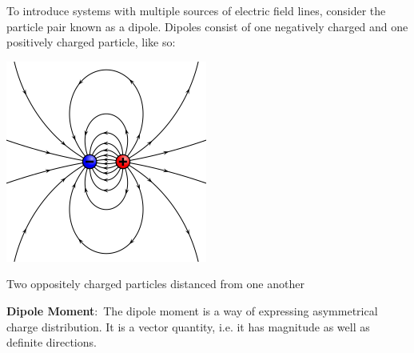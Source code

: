 \documentclass[nobib]{tufte-handout}
\newcommand{\defn}[2]{\noindent\textbf{#1}:\ #2}
\begin{document}
To introduce systems with multiple sources of electric field lines, consider
the particle pair known as a dipole. Dipoles consist of one negatively charged
and one positively charged particle, like so:
\begin{marginfigure}
    \centering
    \includegraphics[width=\textwidth / 2]{images/VFPt_dipole_electric.svg.png}
    \caption{Two oppositely charged particles distanced from one another}
    \label{fig:dipole}
\end{marginfigure}

\defn{Dipole Moment}{The dipole moment is a way of expressing asymmetrical charge distribution.
It is a vector quantity, i.e. it has magnitude as well as definite directions.}
\end{document}
